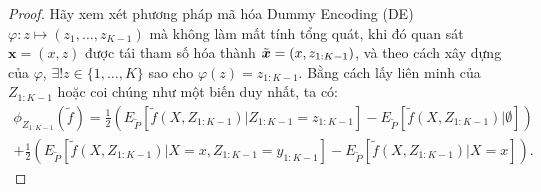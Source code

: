 \documentclass[12pt, a4paper]{article}
\theoremstyle{plain}
\theoremstyle{proposition}
\theoremstyle{lemma}
\newcommand\x{\boldsymbol{x}}
\begin{document}
\begin{proof}
Hãy xem xét phương pháp mã hóa Dummy Encoding (DE) $\varphi:z\mapsto(z_{1},\dots,z_{K-1})$ mà không làm mất tính tổng quát, khi đó quan sát $\x = (x, z)$ được tái tham số hóa thành $\Tilde{\x} = (x, z_{1:K-1})$, và theo cách xây dựng của $\varphi$, $\exists !z\in \{1,\dots,K\}$ sao cho $\varphi(z)=z_{1:K-1}$. Bằng cách lấy liên minh của $Z_{1:K-1}$ hoặc coi chúng như một biến duy nhất, ta có:
\begin{multline}
    \phi_{Z_{1:K-1}}(\tilde{f})=\frac{1}{2}\left( E_{\tilde{P}}\left[\tilde{f}(X,Z_{1:K-1})\vert Z_{1:K-1}=z_{1:K-1}\right]-E_{\tilde{P}}\left[\tilde{f}(X,Z_{1:K-1})\vert\emptyset\right] \right) \\
    +\frac{1}{2} \left( E_{\tilde{P}}\left[\tilde{f}(X,Z_{1:K-1})\vert X=x,Z_{1:K-1}=y_{1:K-1}\right]-E_{\tilde{P}}\left[\tilde{f}(X,Z_{1:K-1})\vert X=x\right]\right).
\end{multline}


\end{proof}
\end{document}
